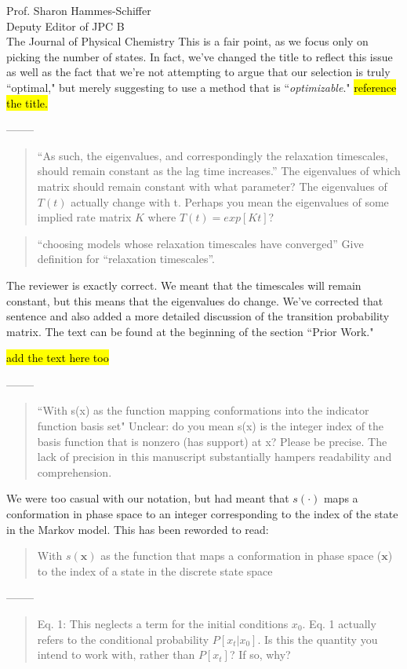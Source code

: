 \documentclass{letter}
\newcommand{\separate}{\begin{center}--------\end{center}}
\begin{document}
\begin{letter}{Prof. Sharon Hammes-Schiffer \\ Deputy Editor of JPC B \\ The Journal of Physical Chemistry}
This is a fair point, as we focus only on picking the number of states. In fact, we've changed the title to reflect this issue as well as the fact that we're not attempting to argue that our selection is truly ``optimal," but merely suggesting to use a method that is ``{\it optimizable}." \hl{reference the title.}

\separate
\begin{quote}
``As such, the eigenvalues, and correspondingly the relaxation timescales, should remain constant as the lag time increases.''  The eigenvalues of which matrix should remain constant with what parameter?  The eigenvalues of $T(t)$ actually change with t.  Perhaps you mean the eigenvalues of some implied rate matrix $K$ where $T(t) = exp[Kt]$?
\end{quote}

\begin{quote}
``choosing models whose relaxation timescales have converged''  Give definition for ``relaxation timescales''.
\end{quote}

The reviewer is exactly correct. We meant that the timescales will remain constant, but this means that the eigenvalues do change. We've corrected that sentence and also added a more detailed discussion of the transition probability matrix. The text can be found at the beginning of the section ``Prior Work."

\hl{add the text here too}
\separate
\begin{quote}
``With s(x) as the function mapping conformations into the indicator function basis set" Unclear: do you mean s(x) is the integer index of the basis function that is nonzero (has support) at x?  Please be precise.  The lack of precision in this manuscript substantially hampers readability and comprehension.
\end{quote}

We were too casual with our notation, but had meant that $s(\cdot)$ maps a conformation in phase space to an integer corresponding to the index of the state in the Markov model. This has been reworded to read:

\begin{quote}
With $s(\mathbf{x})$ as the function that maps a conformation in phase space ($\mathbf{x}$) to the index of a state in the discrete state space
\end{quote}
\separate
\begin{quote}
Eq. 1: This neglects a term for the initial conditions $x_0$.  Eq. 1 actually refers to the conditional probability $P[{x_t}|x_0]$.  Is this the quantity you intend to work with, rather than $P[{x_t}]$?  If so, why?
\end{quote}


\end{letter}
\end{document}
